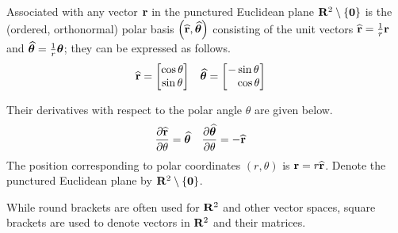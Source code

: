 Associated with any vector $\mathbf{r}$ in the punctured Euclidean plane $\mathbf{R}^2 \setminus \left\{\mathbf{0}\right\}$ is the (ordered, orthonormal) polar basis $\left(\widehat{\mathbf{r}}, \widehat{\bm{\theta}}\right)$ consisting of the unit vectors $\widehat{\mathbf{r}} = \frac{1}{r} \mathbf{r}$ and $\widehat{\bm{\theta}} = \frac{1}{r} \bm{\theta}$; they can be expressed as follows.
\begin{align*}
	\widehat{\mathbf{r}}  & =
	\begin{bmatrix}
		\cos \theta \\
		\sin \theta
	\end{bmatrix}
	               &
	\widehat{\bm{\theta}} & =
	\begin{bmatrix}
		- \sin \theta \\
		\phantom{+} \cos \theta
	\end{bmatrix}
\end{align*}

Their derivatives with respect to the polar angle $\theta$ are given below.
\begin{align*}
	\frac{\partial \widehat{\mathbf{r}}}{\partial \theta}  & = \widehat{\bm{\theta}}
	                                                &
	\frac{\partial \widehat{\bm{\theta}}}{\partial \theta} & = - \widehat{\mathbf{r}}
\end{align*}
The position corresponding to polar coordinates $(r, \theta)$ is $\mathbf{r} = r \widehat{\mathbf{r}}$.
Denote the punctured Euclidean plane by $\mathbf{R}^2 \setminus \left\{\mathbf{0}\right\}$.

While round brackets are often used for $\mathbf{R}^2$ and other vector spaces, square brackets are used to denote vectors in $\mathbf{R}^2$ and their matrices.

